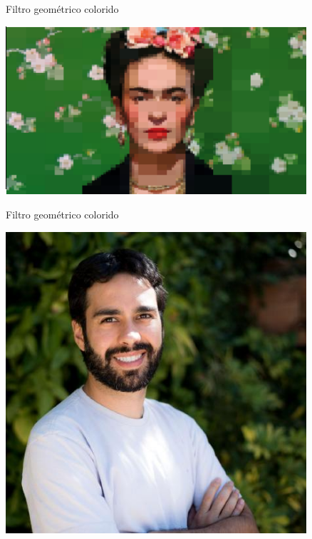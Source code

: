 \documentclass[
  ignorenonframetext,
]{beamer}
\begin{document}
\begin{frame}{Filtro geométrico colorido}
\protect\hypertarget{filtro-geomuxe9trico-colorido-6}{}

\small

\includegraphics[width=4.4in]{IMAGENS/images2}

\begin{center}
\tiny{}
\end{center}

\end{frame}

\begin{frame}{Filtro geométrico colorido}
\protect\hypertarget{filtro-geomuxe9trico-colorido-7}{}

\small

\includegraphics[width=4.4in]{IMAGENS/guilherme}

\begin{center}
\tiny{}
\end{center}

\end{frame}
\end{document}
